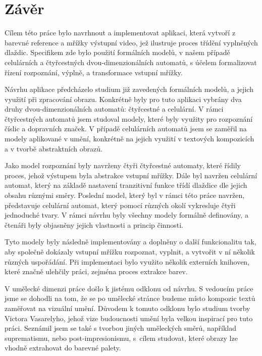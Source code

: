 \chapter{Závěr}
\label{conclusion}

Cílem této práce bylo navrhnout a implementovat aplikaci, která vytvoří z barevné reference a mřížky výstupní video, jež ilustruje proces třídění vyplněných dlaždic. Specifikem zde bylo použití formálních modelů, v našem případě celulárních a čtyřcestných dvou-dimenzionálních automatů, s účelem formalizovat řízení rozpoznání, výplně, a transformace vstupní mřížky. 

Návrhu aplikace předcházelo studium již zavedených formálních modelů, a jejich využití při zpracování obrazu. Konkrétně byly pro tuto aplikaci vybrány dva druhy dvou-dimenzionálních automatů: čtyřcestné a celulární. V rámci čtyřcestných automatů jsem studoval modely, které byly využity pro rozpoznání číslic a dopravních značek. V případě celulárních automatů jsem se zaměřil na modely aplikované v umění, konkrétně na jejich využití v textových kompozicích a v tvorbě abstraktních obrazů.

Jako model rozpoznání byly navrženy čtyři čtyřcestné automaty, které řídily proces, jehož výstupem byla abstrakce vstupní mřížky. Dále byl navržen celulární automat, který na základě nastavení tranzitivní funkce třídí dlaždice dle jejich obsahu různými směry. Poslední model, který byl v rámci této práce navržen, představuje celulární automat, který pomocí různých okolí vykresluje čtyři jednoduché tvary. V rámci návrhu byly všechny modely formálně definovány, a čtenáři byly objasněny jejich vlastnosti a princip činnosti.

Tyto modely byly následně implementovány a doplněny o další funkcionalitu tak, aby společně dokázaly vstupní mřížku rozpoznat, vyplnit, a vytvořit v ní několik různých uspořádání. Při implementaci bylo využito několik externích knihoven, které značně ulehčily práci, zejména proces extrakce barev. 

V umělecké dimenzi práce došlo k jistému odklonu od návrhu. S vedoucím práce jsme se dohodli na tom, že se po umělecké stránce budeme místo kompozic textů zaměřovat na vizuální umění. Důvodem k tomuto odklonu bylo studium tvorby Victora Vasarelyho, jehož vize budoucnosti umění byla velkou inspirací pro tuto práci. Seznámil jsem se také s tvorbou jiných uměleckých směrů, například suprematismu, nebo post-impresionismu, s~cílem studovat, které obrazy lze vhodně extrahovat do barevné palety.

